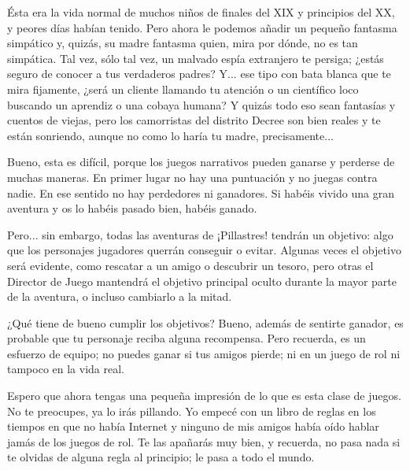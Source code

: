 Ésta era la vida normal de muchos niños de finales del XIX y principios del XX, y peores días habían tenido. Pero ahora le podemos añadir un pequeño fantasma simpático y, quizás, su madre fantasma quien, mira por dónde, no es tan simpática. Tal vez, sólo tal vez, un malvado espía extranjero te persiga; ¿estás seguro de conocer a tus verdaderos padres? Y... ese tipo con bata blanca que te mira fijamente, ¿será un cliente llamando tu atención o un científico loco buscando un aprendiz o una cobaya humana? Y quizás todo eso sean fantasías y cuentos de viejas, pero los camorristas del distrito Decree son bien reales y te están sonriendo, aunque no como lo haría tu madre, precisamente...


Bueno, esta es difícil, porque los juegos narrativos pueden ganarse y perderse de muchas maneras. En primer lugar no hay una puntuación y no juegas contra nadie. En ese sentido no hay perdedores ni ganadores. Si habéis vivido una gran aventura y os lo habéis pasado bien, habéis ganado.

Pero... sin embargo, todas las aventuras de ¡Pillastres! tendrán un objetivo: algo que los personajes jugadores querrán conseguir o evitar. Algunas veces el objetivo será evidente, como rescatar a un amigo o descubrir un tesoro, pero otras el Director de Juego mantendrá el objetivo principal oculto durante la mayor parte de la aventura, o incluso cambiarlo a la mitad.

¿Qué tiene de bueno cumplir los objetivos? Bueno, además de sentirte ganador, es probable que tu personaje reciba alguna recompensa. Pero recuerda, es un esfuerzo de equipo; no puedes ganar si tus amigos pierde; ni en un juego de rol ni tampoco en la vida real.


Espero que ahora tengas una pequeña impresión de lo que es esta clase de juegos. No te preocupes, ya lo irás pillando. Yo empecé con un libro de reglas en los tiempos en que no había Internet y ninguno de mis amigos había oído hablar jamás de los juegos de rol. Te las apañarás muy bien, y recuerda, no pasa nada si te olvidas de alguna regla al principio; le pasa a todo el mundo.